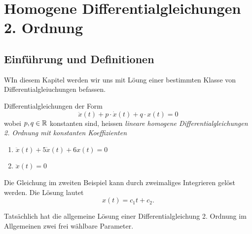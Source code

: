 \section{Homogene Differentialgleichungen 2. Ordnung}

\subsection{Einführung und Definitionen}

WIn diesem Kapitel werden wir uns mit Löung einer bestimmten Klasse von Differentialgleiuchungen befassen.

\begin{definition}{}{}
    Differentialgleichungen der Form
    \[
        \ddot{x}(t)+p\cdot\dot{x}(t)+q\cdot x(t)=0
    \]
    wobei \(p,q\in \mathbb{R}\) konstanten sind, heissen \emph{lineare homogene Differentialgleichungen 2. Ordnung mit konstanten Koeffizienten}


\end{definition}


\begin{bsp}{}{}
    \begin{enumerate}
        \item \(\ddot{x}(t)+5\dot{x}(t)+6x(t)=0\)
        \item \(\ddot{x}(t)=0\)
    \end{enumerate}
\end{bsp}

Die Gleichung im zweiten Beispiel kann durch zweimaliges Integrieren
gelöst werden. Die Lösung lautet
\[
    x(t)=c_1t+c_2.
\]

Tatsächlich hat die allgemeine Lösung einer Differentialgleichung
2. Ordnung im Allgemeinen zwei frei wählbare Parameter.

